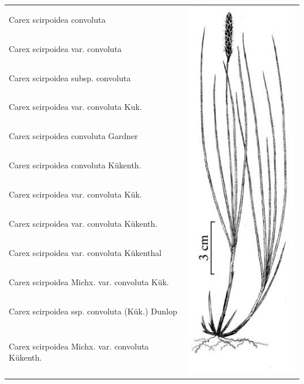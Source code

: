 \documentclass{bmcart}
\begin{document}
\begin{tabular}{| l | r |}
\hline
Carex scirpoidea convoluta & 
\multirow{25}{*}{\includegraphics{images/carex.png}}\\
Carex scirpoidea var. convoluta & \\
Carex scirpoidea subsp. convoluta & \\
Carex scirpoidea var. convoluta Kuk. & \\
Carex scirpoidea convoluta Gardner & \\
Carex scirpoidea convoluta Kükenth. & \\
Carex scirpoidea var. convoluta Kük. & \\
Carex scirpoidea var. convoluta Kükenth. & \\
Carex scirpoidea var. convoluta Kükenthal & \\
Carex scirpoidea Michx. var. convoluta Kük. & \\
Carex scirpoidea ssp. convoluta (Kük.) Dunlop & \\
Carex scirpoidea Michx. var. convoluta Kükenth. & \\

\end{tabular}
\end{document}
